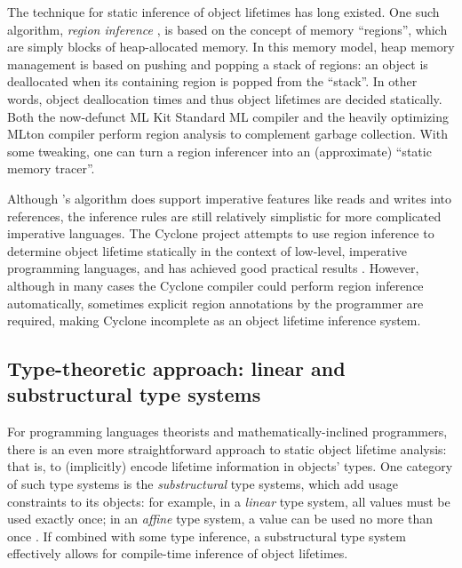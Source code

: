 The technique for static inference of object lifetimes has long existed. One such algorithm,
\emph{region inference} \citep{RegionInference, StackOfRegions}, is based on the concept of memory ``regions'', which are simply
blocks of heap-allocated memory. In this memory model, heap memory management is based on pushing
and popping a stack of regions: an object is deallocated when its containing region is popped from the
``stack''. In other words, object deallocation times and thus object lifetimes are decided statically. Both
the now-defunct ML Kit Standard ML compiler and the heavily optimizing MLton \citep{MLton} compiler
perform region analysis to complement garbage collection. With some tweaking, one can turn a
region inferencer into an (approximate) ``static memory tracer''.

Although \cite{RegionInference}'s algorithm does support imperative features like reads and writes into references,
the inference rules are still relatively simplistic for more complicated imperative languages. The Cyclone
project attempts to use region inference to determine object lifetime statically in the context of
low-level, imperative programming languages, and has achieved good practical results \citep{Cyclone}. However,
although in many cases the Cyclone compiler could perform region inference automatically, sometimes explicit
region annotations by the programmer are required, making Cyclone incomplete as an object lifetime inference
system.

\subsection{Type-theoretic approach: linear and substructural type systems}
For programming languages theorists and mathematically-inclined programmers, there is an even more straightforward
approach to static object lifetime analysis: that is, to (implicitly) encode lifetime information in objects'
types. One category of such type systems is the \emph{substructural} type systems, which add usage constraints to
its objects: for example, in a \emph{linear} type system, all values must be used exactly once; in an \emph{affine}
type system, a value can be used no more than once \citep{SubstructuralTypes}. If combined with some type
inference, a substructural type system effectively allows for compile-time inference of object lifetimes.

